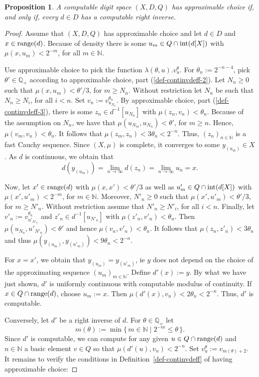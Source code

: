 \documentclass[microtype]{jloganal}
\theoremstyle{plain}
\newtheorem{proposition}[theorem]{Proposition}
\theoremstyle{definition}
\newcommand{\NN}{\mathbb{N}}
\newcommand{\QQ}{\mathbb{Q}}
\newcommand{\set}[2]{\mbox{$\{\,#1 \mid #2 \,\}$}}
\def\range{\mathop{\mathstrut\rm range}}
\def\int{\mathop{\mathstrut\rm int}\nolimits}
\begin{document}
\begin {proposition}\label{prop-choice-inv}
A computable digit space $(X, D, Q)$ has approximable choice if, and only if, every $d \in D$ has a computable right inverse.
\end{proposition}
\begin{proof}
Assume that $(X, D, Q)$ has approximable choice and let $d\in D$ and $x \in \range(d)$. Because of density there is some $u_m \in Q \cap \int(d[X])$ with $\mu(x,u_m) < 2^{-m}$, for all $m \in \NN$.

Use approximable choice to pick the function 
$\lambda(\theta,u).v^{\theta}_u$.  
For $\theta_n := 2^{-n-4}$, pick $\theta' \in \QQ_+$ according to approximable choice, part (\ref{def-continvdeff-2}).
Let $N_n \ge 0$ such that $\mu(x, u_m) < \theta'/3$, for $m \ge N_n$. 
Without restriction let $N_n$ be such that $N_n \ge N_i$, for all $i < n$. Set $v_n := v^{\theta_n}_{u_{N_n}}$.
By approximable choice, part (\ref{def-continvdeff-3}), there is some $z_n \in d^{-1}[u_{N_n}]$ with
$\mu(z_n, v_n) < \theta_n$.
Because of the assumption on $N_n$, we have that $\mu(u_{N_m}, u_{N_n}) < \theta'$, 
for $m \ge n$. Hence, $\mu(v_m, v_n) < \theta_n$. It follows that 
$\mu(z_m, z_n) < 3\theta_n < 2^{-n}$. Thus, $(z_n)_{n \in \NN}$ is a fast Cauchy sequence. 
Since $(X,\mu)$ is complete, it converges to some $y_{(u_m)} \in X$. 
As $d$ is continuous, we obtain that 
\[
d(y_{(u_m)}) = \lim_{n \to \infty} d(z_n) = \lim_{n \to \infty} u_n = x.
\]

Now, let $x' \in \range(d)$ with $\mu(x, x') < \theta'/3$ as well as $u'_m \in Q \cap \int(d[X])$ with $\mu(x', u'_m) < 2^{-m}$, for $m \in \NN$. Moreover, $N'_n \ge 0$ such that $\mu(x', u'_m) < \theta'/3$, for $m \ge N'_n$. Without restriction assume that $N'_n \ge N'_i$, for all $i < n$. Finally, let $v'_n := v^{\theta_n}_{u'_{N'_n}}$ and $z'_n \in d^{-1}[u_{N'_n}]$ with $\mu(z'_n, v'_n) < \theta_n$. Then $\mu(u_{N_n}, u'_{N'_n}) < \theta'$ and hence $\mu(v_n, v'_n) < \theta_n$. It follows that $\mu(z_n, z'_n) < 3\theta_n$ and thus $\mu(y_{(u_m)}, y_{(u'_m)}) < 9\theta_n < 2^{-n}$.

For $x=x'$, we obtain that $y_{(u_m)} = y_{(u'_m)}$, ie $y$ does not depend on the choice of the approximating sequence $(u_m)_{m \in \NN}$. Define $d'(x) := y$. By what we have just shown, $d'$ is uniformly continuous with computable modulus of continuity. If $x \in Q \cap \range(d)$, choose $u_m := x$. Then $\mu(d'(x), v_n) < 2\theta_n < 2^{-n}$. Thus, $d'$ is computable.

Conversely, let $d'$ be a right inverse of $d$. For $\theta \in \QQ_+$ let 
\[
m(\theta) := \min\set{m\in \NN}{2^{-m} \le \theta}.
\]
Since $d'$ is computable, we can compute for any given $u \in Q \cap \range(d)$ and $n \in \NN$ a basic element $v \in Q$ so that $\mu(d'(u), v_n) < 2^{-n}$. Set $v^{\theta}_u := v_{m(\theta)+2}$. It remains to verify the conditions in Definition~\ref{def-continvdeff} of having approximable choice:


\end{proof}
\end{document}
